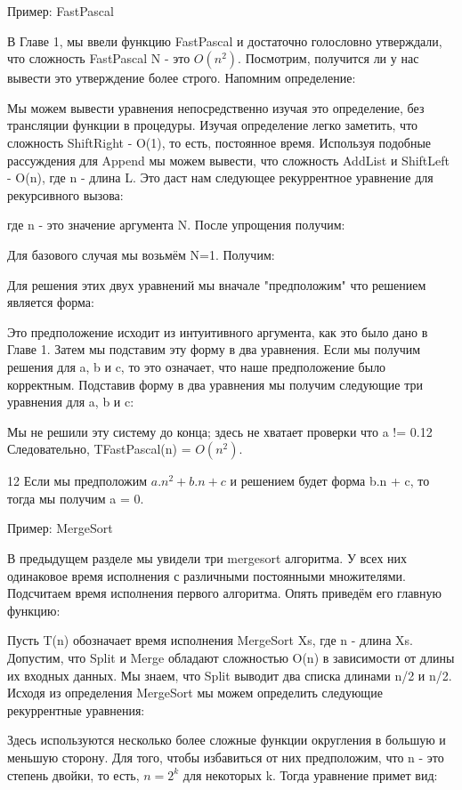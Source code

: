 Пример: FastPascal

В Главе 1, мы ввели функцию FastPascal и достаточно голословно утверждали, что сложность {FastPascal N} - это $O(n^2)$. Посмотрим, получится ли у нас вывести это утверждение более строго. Напомним определение:

Мы можем вывести уравнения непосредственно изучая это определение, без трансляции функции в процедуры. Изучая определение легко заметить, что сложность ShiftRight - O(1), то есть, постоянное время. Используя подобные рассуждения для Append мы можем вывести, что сложность AddList и ShiftLeft - O(n), где n - длина L. Это даст нам следующее рекуррентное уравнение для рекурсивного вызова:

где n - это значение аргумента N. После упрощения получим:

Для базового случая мы возьмём N=1. Получим:

Для решения этих двух уравнений мы вначале "предположим" что решением является форма:

Это предположение исходит из интуитивного аргумента, как это было дано в Главе 1. Затем мы подставим эту форму в два уравнения. Если мы получим решения для a, b и c, то это означает, что наше предположение было корректным. Подставив форму в два уравнения мы получим следующие три уравнения для a, b и c:

Мы не решили эту систему до конца; здесь не хватает проверки что a != 0.12 Следовательно, TFastPascal(n) = $O(n^2)$.

12 Если мы предположим $a.n^2 + b.n + c$ и решением будет форма b.n + c, то тогда мы получим a = 0.

Пример: MergeSort

В предыдущем разделе мы увидели три mergesort алгоритма. У всех них одинаковое время исполнения с различными постоянными множителями. Подсчитаем время исполнения первого алгоритма. Опять приведём его главную функцию:

Пусть T(n) обозначает время исполнения {MergeSort Xs}, где n - длина Xs. Допустим, что Split и Merge обладают сложностью O(n) в зависимости от длины их входных данных. Мы знаем, что Split выводит два списка длинами n/2 и n/2. Исходя из определения MergeSort мы можем определить следующие рекуррентные уравнения:

Здесь используются несколько более сложные функции округления в большую и меньшую сторону. Для того, чтобы избавиться от них предположим, что n - это степень двойки, то есть, $n = 2^k$ для некоторых k. Тогда уравнение примет вид:

